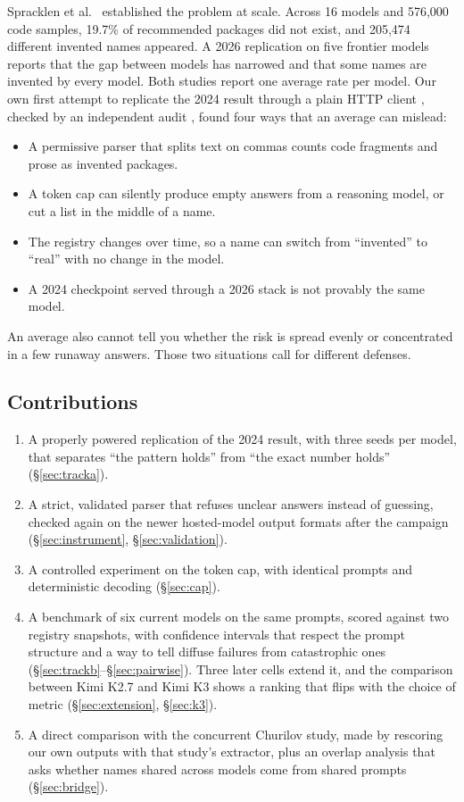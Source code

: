 \documentclass[10pt,twocolumn,letterpaper]{article}
\begin{document}
Spracklen et al.\ \citep{spracklen2025package} established the problem at scale. Across 16 models
and 576,000 code samples, 19.7\% of recommended packages did not exist, and 205,474 different invented
names appeared. A 2026 replication on five frontier models \citep{churilov2026range} reports that the
gap between models has narrowed and that some names are invented by every model. Both studies report
one average rate per model. Our own first attempt to replicate the 2024 result through a plain HTTP
client \citep{anderson2026replication}, checked by an independent audit \citep{codex2026audit},
found four ways that an average can mislead:
\begin{itemize}
\item A permissive parser that splits text on commas counts code fragments and prose as invented
  packages.
\item A token cap can silently produce empty answers from a reasoning model, or cut a list in the
  middle of a name.
\item The registry changes over time, so a name can switch from ``invented'' to ``real'' with no
  change in the model.
\item A 2024 checkpoint served through a 2026 stack is not provably the same model.
\end{itemize}
An average also cannot tell you whether the risk is spread evenly or concentrated in a few runaway
answers. Those two situations call for different defenses.

\subsection{Contributions}

\begin{enumerate}
\item A properly powered replication of the 2024 result, with three seeds per model, that separates
  ``the pattern holds'' from ``the exact number holds'' (\S\ref{sec:tracka}).
\item A strict, validated parser that refuses unclear answers instead of guessing, checked again on
  the newer hosted-model output formats after the campaign (\S\ref{sec:instrument},
  \S\ref{sec:validation}).
\item A controlled experiment on the token cap, with identical prompts and deterministic decoding
  (\S\ref{sec:cap}).
\item A benchmark of six current models on the same prompts, scored against two registry snapshots,
  with confidence intervals that respect the prompt structure and a way to tell diffuse failures from
  catastrophic ones (\S\ref{sec:trackb}--\S\ref{sec:pairwise}). Three later cells extend it, and the
  comparison between Kimi K2.7 and Kimi K3 shows a ranking that flips with the choice of metric
  (\S\ref{sec:extension}, \S\ref{sec:k3}).
\item A direct comparison with the concurrent Churilov study, made by rescoring our own outputs
  with that study's extractor, plus an overlap analysis that asks whether names shared across models
  come from shared prompts (\S\ref{sec:bridge}).
\end{enumerate}
\end{document}
